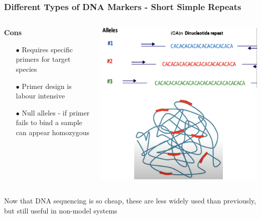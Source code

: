 \documentclass{beamer}
\begin{document}
\begin{frame}
	
	\frametitle{Different Types of DNA Markers - Short Simple Repeats}
	
	\begin{columns}
		\begin{column}{0.5\textwidth}
			\textbf{Cons}
			\begin{itemize}
				\item[$\bullet$] Requires specific primers for target species
				\item[$\bullet$] Primer design is labour intensive
				\item[$\bullet$] Null alleles - if primer fails to bind a sample can appear homozygous

			\end{itemize}
		\end{column}
		\begin{column}{0.5\textwidth}
			\includegraphics[keepaspectratio, width  = \textwidth]{img/microsat}
		\end{column}
	\end{columns}
	
	\vspace{15pt}
		Now that DNA sequencing is so cheap, these are less widely used than previously, but still useful in non-model systems
\end{frame}
\end{document}
